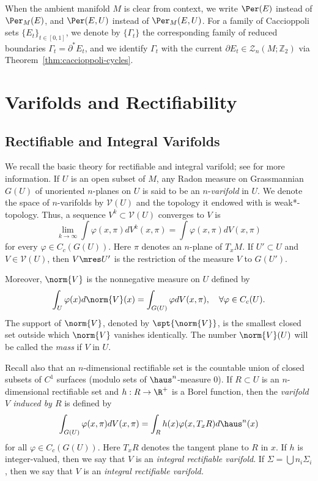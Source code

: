 \begin{notation}
When the ambient manifold $M$ is clear from context, we write $\Per(E)$ instead of $\Per_M(E)$, and
$\Per(E, U)$ instead of $\Per_M(E, U)$. For a family of Caccioppoli sets $\{E_t\}_{t \in [0,1]}$, we
denote by $\{\Gamma_t\}$ the corresponding family of reduced boundaries $\Gamma_t = \partial^* E_t$,
and we identify $\Gamma_t$ with the current $\partial E_t \in \mathcal{Z}_n(M; \mathbb{Z}_2)$ via
Theorem~\ref{thm:caccioppoli-cycles}.
\end{notation}

\section{Varifolds and Rectifiability}\label{sec:varifolds}
\subsection{Rectifiable and Integral Varifolds}\label{subsec:rectifiable-varifolds}
We recall the basic theory for rectifiable and integral varifold; see \cite{Sim84} for more information. If $U$ is an open subset of $M$, any Radon measure on Grassmannian $G(U)$ of unoriented $n$-planes on $U$ is said to be an $n$-\textit{varifold} in $U$. We denote the space of $n$-varifolds by $\mathcal{V}(U)$ and the topology it endowed with is weak*-topology. Thus, a sequence ${V^k} \subset \mathcal{V}(U)$ converges to $V$ is 
\begin{equation*}
    \lim_{k \to \infty}\int \varphi(x, \pi)dV^k(x, \pi) = \int \varphi(x, \pi)dV(x, \pi)
\end{equation*}
for every $\varphi \in C_c(G(U))$. Here $\pi$ denotes an $n$-plane of $T_xM$. If $U' \subset U$ and $V \in \mathcal{V}(U)$, then $V \mres U'$ is the restriction of the measure $V$ to $G(U')$.

Moreover, $\norm{V}$ is the nonnegative measure on $U$ defined by
\begin{equation*}
    \int_U \varphi(x)d\norm{V}(x) = \int_{G(U)}\varphi dV(x, \pi), \quad \forall \varphi \in C_c(U).
\end{equation*}
The support of $\norm{V}$, denoted by $\spt{\norm{V}}$, is the smallest closed set outside which $\norm{V}$ vanishes identically. The number $\norm{V}(U)$ will be called the \textit{mass} if $V$ in $U$.

Recall also that an $n$-dimensional rectifiable set is the countable union of closed subsets of $C^1$ surfaces (modulo sets of $\haus^n$-measure $0$). If $R \subset U$ is an $n$-dimensional rectifiable set and $h: R \to \R^+$ is a Borel function, then the \textit{varifold $V$ induced by $R$} is defined by
\begin{equation*}
    \int_{G(U)}\varphi(x, \pi)dV(x, \pi) = \int_R h(x) \varphi(x, T_x R)d\haus^n(x)
\end{equation*}
for all $\varphi \in C_c(G(U))$. Here $T_xR$ denotes the tangent plane to $R$ in $x$. If $h$ is integer-valued, then we say that $V$ is an \textit{integral rectifiable varifold}. If $\Sigma = \bigcup n_i \Sigma_i$, then we say that $V$ is an \textit{integral rectifiable varifold.}

